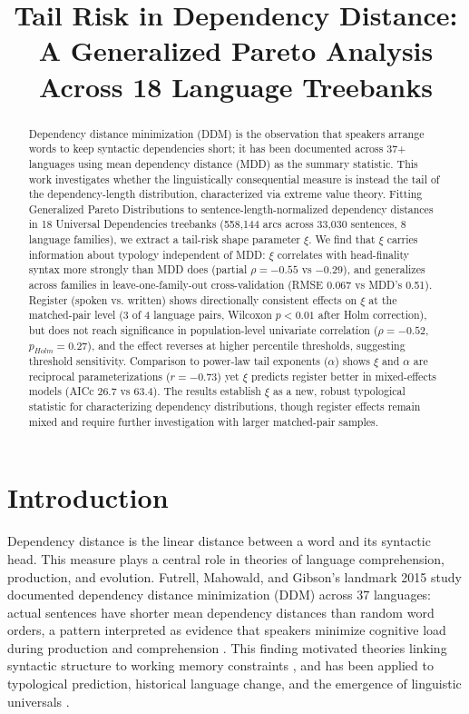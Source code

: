 \documentclass[11pt,letterpaper]{article}
\title{Tail Risk in Dependency Distance: A Generalized Pareto Analysis Across 18 Language Treebanks}
\author{}
\date{}
\begin{document}
\maketitle

\begin{abstract}
Dependency distance minimization (DDM) is the observation that speakers arrange words to keep syntactic dependencies short; it has been documented across 37+ languages using mean dependency distance (MDD) as the summary statistic. This work investigates whether the linguistically consequential measure is instead the tail of the dependency-length distribution, characterized via extreme value theory. Fitting Generalized Pareto Distributions to sentence-length-normalized dependency distances in 18 Universal Dependencies treebanks (558,144 arcs across 33,030 sentences, 8 language families), we extract a tail-risk shape parameter $\xi$. We find that $\xi$ carries information about typology independent of MDD: $\xi$ correlates with head-finality syntax more strongly than MDD does (partial $\rho = -0.55$ vs $-0.29$), and generalizes across families in leave-one-family-out cross-validation (RMSE 0.067 vs MDD's 0.51). Register (spoken vs. written) shows directionally consistent effects on $\xi$ at the matched-pair level (3 of 4 language pairs, Wilcoxon $p<0.01$ after Holm correction), but does not reach significance in population-level univariate correlation ($\rho=-0.52$, $p_{Holm}=0.27$), and the effect reverses at higher percentile thresholds, suggesting threshold sensitivity. Comparison to power-law tail exponents ($\alpha$) shows $\xi$ and $\alpha$ are reciprocal parameterizations ($r=-0.73$) yet $\xi$ predicts register better in mixed-effects models (AICc 26.7 vs 63.4). The results establish $\xi$ as a new, robust typological statistic for characterizing dependency distributions, though register effects remain mixed and require further investigation with larger matched-pair samples.
\end{abstract}

\section{Introduction}

Dependency distance is the linear distance between a word and its syntactic head. This measure plays a central role in theories of language comprehension, production, and evolution. Futrell, Mahowald, and Gibson's landmark 2015 study documented dependency distance minimization (DDM) across 37 languages: actual sentences have shorter mean dependency distances than random word orders, a pattern interpreted as evidence that speakers minimize cognitive load during production and comprehension \citep{Futrell2015}. This finding motivated theories linking syntactic structure to working memory constraints \citep{Lewis2005}, and has been applied to typological prediction, historical language change, and the emergence of linguistic universals \citep{Liu2017}.
\end{document}
